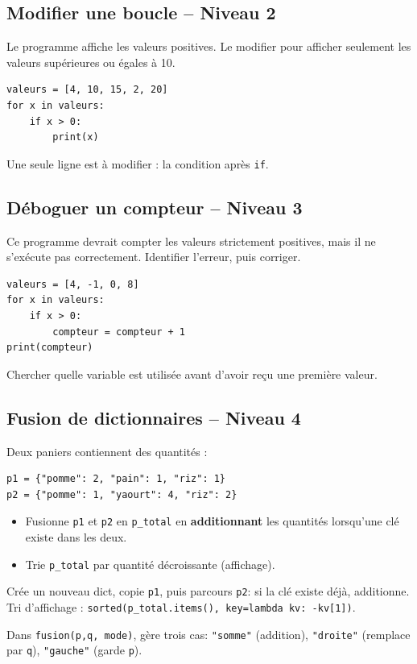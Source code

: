 \documentclass[11pt,a4paper]{article}
\begin{document}
\subsection*{Modifier une boucle -- Niveau 2}
Le programme affiche les valeurs positives. Le modifier pour afficher seulement les valeurs supérieures ou égales à 10.
\begin{lstlisting}
valeurs = [4, 10, 15, 2, 20]
for x in valeurs:
    if x > 0:
        print(x)
\end{lstlisting}
\begin{tcolorbox}[title=Aide]
Une seule ligne est à modifier : la condition après \texttt{if}.
\end{tcolorbox}

\subsection*{Déboguer un compteur -- Niveau 3}
Ce programme devrait compter les valeurs strictement positives, mais il ne s'exécute pas correctement. Identifier l'erreur, puis corriger.
\begin{lstlisting}
valeurs = [4, -1, 0, 8]
for x in valeurs:
    if x > 0:
        compteur = compteur + 1
print(compteur)
\end{lstlisting}
\begin{tcolorbox}[title=Aide]
Chercher quelle variable est utilisée avant d'avoir reçu une première valeur.
\end{tcolorbox}

\subsection*{Fusion de dictionnaires -- Niveau 4}
Deux paniers contiennent des quantités :
\begin{lstlisting}
p1 = {"pomme": 2, "pain": 1, "riz": 1}
p2 = {"pomme": 1, "yaourt": 4, "riz": 2}
\end{lstlisting}
\begin{itemize}
    \item Fusionne \texttt{p1} et \texttt{p2} en \texttt{p\_total} en \textbf{additionnant} les quantités lorsqu'une clé existe dans les deux.
    \item Trie \texttt{p\_total} par quantité décroissante (affichage).
\end{itemize}
\begin{tcolorbox}[title=Aide]
Crée un nouveau dict, copie \texttt{p1}, puis parcours \texttt{p2}: si la clé existe déjà, additionne.\\
Tri d'affichage : \texttt{sorted(p\_total.items(), key=lambda kv: -kv[1])}.
\end{tcolorbox}
\begin{tcolorbox}[title=Bonus -- Aide]
Dans \texttt{fusion(p,q, mode)}, gère trois cas: \texttt{"somme"} (addition), \texttt{"droite"} (remplace par \texttt{q}), \texttt{"gauche"} (garde \texttt{p}).
\end{tcolorbox}
\end{document}
